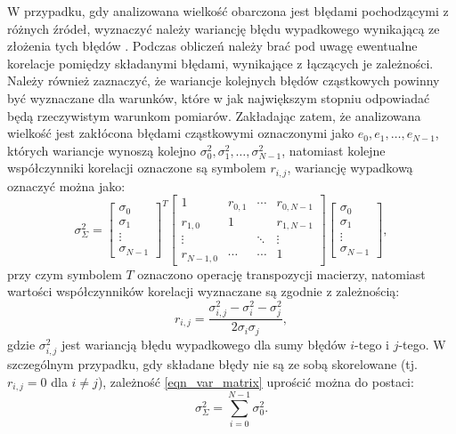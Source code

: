 W przypadku, gdy analizowana wielkość obarczona jest błędami pochodzącymi z różnych źródeł, wyznaczyć należy wariancję błędu wypadkowego wynikającą ze złożenia tych błędów \cite{wymyslo_range}. Podczas obliczeń należy brać pod uwagę ewentualne korelacje pomiędzy składanymi błędami, wynikające z łączących je zależności. Należy również zaznaczyć, że wariancje kolejnych błędów cząstkowych powinny być wyznaczane dla warunków, które w jak największym stopniu odpowiadać będą rzeczywistym warunkom pomiarów. Zakładając zatem, że analizowana wielkość jest zakłócona błędami cząstkowymi oznaczonymi jako $e_{0}, e_{1}, \hdots, e_{N-1}$, których wariancje wynoszą kolejno $\sigma_{0}^{2}, \sigma_{1}^{2}, \hdots, \sigma_{N-1}^{2}$, natomiast kolejne współczynniki korelacji \cite{jcgm_guide} oznaczone są symbolem $r_{i,j}$, wariancję wypadkową oznaczyć można jako:
\begin{equation}
\sigma_{\Sigma}^{2} =
\begin{bmatrix}
\sigma_{0} \\ \sigma_{1} \\ \vdots \\ \sigma_{N-1}
\end{bmatrix}^{T}
\begin{bmatrix}
1         & r_{0,1} & \cdots & r_{0,N-1} \\
r_{1,0}   & 1       &        & r_{1,N-1} \\
\vdots    &         & \ddots & \vdots    \\
r_{N-1,0} & \cdots  & \cdots & 1
\end{bmatrix}
\begin{bmatrix}
\sigma_{0} \\ \sigma_{1} \\ \vdots \\ \sigma_{N-1}
\end{bmatrix}
\label{eqn_var_matrix},
\end{equation}
przy czym symbolem $T$ oznaczono operację transpozycji macierzy, natomiast wartości współczynników korelacji wyznaczane są zgodnie z zależnością:
\begin{equation}
r_{i,j} = \frac{\sigma_{i,j}^{2} - \sigma_{i}^{2} - \sigma_{j}^{2}}{2 \sigma_{i} \sigma_{j}} \label{eqn_var_corr},
\end{equation}
gdzie $\sigma_{i,j}^{2}$ jest wariancją błędu wypadkowego dla sumy błędów $i$-tego i $j$-tego. W szczególnym przypadku, gdy składane błędy nie są ze sobą skorelowane (tj. $r_{i,j} = 0$ dla $i \ne j$), zależność \eqref{eqn_var_matrix} uprościć można do postaci:
\begin{equation}
\sigma_{\Sigma}^{2} = \sum _{i = 0} ^{N-1} \sigma_{0}^2 \label{eqn_var_sum}.
\end{equation}

